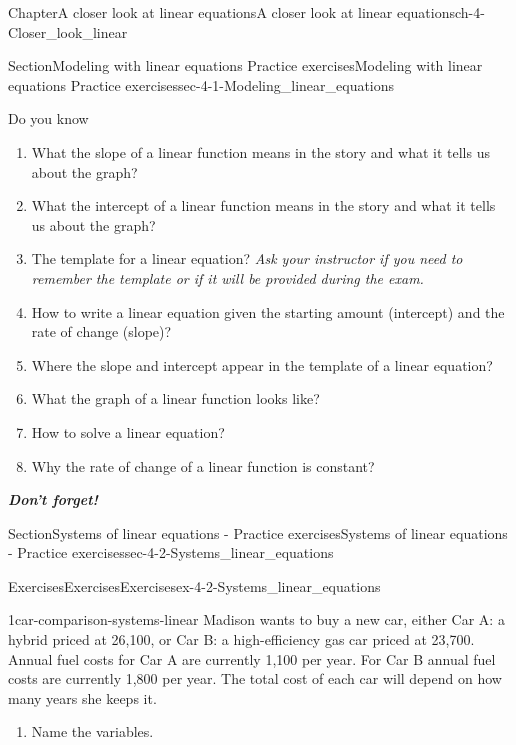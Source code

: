 \documentclass[twoside,11pt,]{book}
\newcommand{\alert}[1]{\textbf{\textit{#1}}}
\numberwithin{equation}{section}
\begin{document}
\begin{chapterptx}{Chapter}{A closer look at linear equations}{}{A closer look at linear equations}{}{}{ch-4-Closer_look_linear}
\begin{sectionptx}{Section}{Modeling with linear equations \textemdash{} Practice exercises}{}{Modeling with linear equations \textemdash{} Practice exercises}{}{}{sec-4-1-Modeling_linear_equations}
\begin{conclusion}{Do you know \textellipsis{}}
\begin{enumerate}[label={\Alph*.}]
\item{}What the slope of a linear function means in the story and what it tells us about the graph?%
\item{}What the intercept of a linear function means in the story and what it tells us about the graph?%
\item{}The template for a linear equation? \emph{Ask your instructor if you need to remember the template or if it will be provided during the exam.}%
\item{}How to write a linear equation given the starting amount (intercept) and the rate of change (slope)?%
\item{}Where the slope and intercept appear in the template of a linear equation?%
\item{}What the graph of a linear function looks like?%
\item{}How to solve a linear equation?%
\item{}Why the rate of change of a linear function is constant?%
\end{enumerate}
%
\par
\alert{Don't forget!}%
\end{conclusion}%
\end{sectionptx}
%
%
\typeout{************************************************}
\typeout{************************************************}
%
\begin{sectionptx}{Section}{Systems of linear equations - Practice exercises}{}{Systems of linear equations - Practice exercises}{}{}{sec-4-2-Systems_linear_equations}
%
%
\typeout{************************************************}
\typeout{************************************************}
%
\begin{exercises-subsection-numberless}{Exercises}{Exercises}{}{Exercises}{}{}{ex-4-2-Systems_linear_equations}
\begin{divisionexercise}{1}{}{}{car-comparison-systems-linear}%
Madison wants to buy a new car, either Car A: a hybrid priced at \textdollar{}26,100, or Car B: a high-efficiency gas car priced at \textdollar{}23,700. Annual fuel costs for Car A are currently \textdollar{}1,100 per year. For Car B annual fuel costs are currently \textdollar{}1,800 per year. The total cost of each car will depend on how many years she keeps it.%
\begin{enumerate}[label=(\alph*),ref=\alph*]%
\item{}Name the variables.%

\end{enumerate}
\end{divisionexercise}
\end{exercises-subsection-numberless}
\end{sectionptx}
\end{chapterptx}
\end{document}
